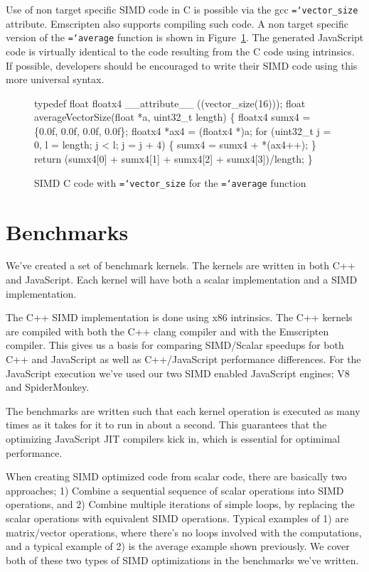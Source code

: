 \documentclass[preprint]{sigplanconf}
\newcommand{\ttt}[1]{{\texttt{\hyphenchar\font=`\-\relax #1}}}%
\begin{document}
Use of non target specific SIMD code in C is possible via the gcc
\ttt{vector\_size} attribute.  Emscripten also supports compiling such code.  A
non target specific version of the \ttt{average} function is shown in
Figure~\ref{fig:average-vector}.  The generated JavaScript code is virtually
identical to the code resulting from the C code using intrinsics. If
possible, developers should be encouraged to write their SIMD code using
this more universal syntax.

\begin{figure}
\begin{small}
\begin{program}[style=tt, number=true]
typedef float floatx4 \_\_attribute\_\_ ((vector\_size(16)));
fl\tab{}oat averageVectorSize(float *a, uint32\_t length) \{
  floatx4 sumx4 = \{0.0f, 0.0f, 0.0f, 0.0f\};
  floatx4 *ax4  = (floatx4 *)a;
  fo\tab{}r (uint32\_t j = 0, l = length; j < l; j = j + 4) \{
    sumx4 = sumx4 + *(ax4++);\untab{}
  \}
  return (\tab{}sumx4[0] + sumx4[1] +
          sumx4[2] + sumx4[3])/length;\untab{}\untab{}
\}
\end{program}
\end{small}
\caption{SIMD C code with \ttt{vector\_size} for the \ttt{average} function}
\label{fig:average-vector}
\end{figure}

\section{Benchmarks}

We've created a set of benchmark kernels.  The kernels are written in
both C++ and JavaScript.  Each kernel will have both a scalar implementation
and a SIMD implementation.

The C++ SIMD implementation is done using x86 intrinsics.  The C++ kernels are 
compiled with both the C++ clang compiler and with the Emscripten compiler.  
This gives us a basis for comparing SIMD/Scalar speedups for both C++ and
JavaScript as well as C++/JavaScript performance differences.  For the JavaScript
execution we've used our two SIMD enabled JavaScript engines; V8 and SpiderMonkey.

The benchmarks are written such that each kernel operation is executed as many times
as it takes for it to run in about a second.  This guarantees that the optimizing
JavaScript JIT compilers kick in, which is essential for optimimal performance.

When creating SIMD optimized code from scalar code, there are basically two
approaches; 1) Combine a sequential sequence of scalar operations into
SIMD operations, and 2) Combine multiple iterations of simple loops, by replacing
the scalar operations with equivalent SIMD operations.  Typical examples of
1) are matrix/vector operations, where there's no loops involved with
the computations, and a typical example of 2) is the average example shown previously.
We cover both of these two types of SIMD optimizations in the benchmarks we've written.
\end{document}
